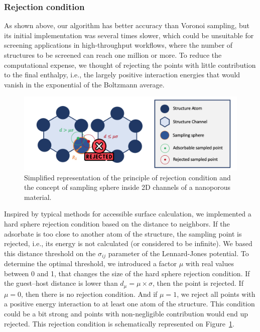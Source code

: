 \documentclass[main]{subfiles}
\begin{document}
\subsubsection{Rejection condition}\label{sct:rejection_condition}

As shown above, our algorithm has better accuracy than Voronoi sampling, but its initial implementation was several times slower, which could be unsuitable for screening applications in high-throughput workflows, where the number of structures to be screened can reach one million or more. To reduce the computational expense, we thought of rejecting the points with little contribution to the final enthalpy, i.e., the largely positive interaction energies that would vanish in the exponential of the  Boltzmann average.

\begin{figure}[ht]
\centering
  \includegraphics[width=\linewidth]{figures/3-fastsim/rejection_sampling_sphere.png}
  \caption{Simplified representation of the principle of rejection condition and the concept of sampling sphere inside 2D channels of a nanoporous material.}\label{fgr:feature}
\end{figure}

Inspired by typical methods for accessible surface calculation, we implemented a hard sphere rejection condition based on the distance to neighbors. If the adsorbate is too close to another atom of the structure, the sampling point is rejected, i.e., its energy is not calculated (or considered to be infinite). We based this distance threshold on the $\sigma_{ij}$ parameter of the Lennard-Jones potential. To determine the optimal threshold, we introduced a factor $\mu$ with real values between 0 and 1, that changes the size of the hard sphere rejection condition. If the guest--host distance is lower than $d_{\mu} = \mu \times \sigma$, then the point is rejected. If $\mu = 0$, then there is no rejection condition. And if $\mu = 1$, we reject all points with a positive energy interaction to at least one atom of the structure. This condition could be a bit strong and points with non-negligible contribution would end up rejected. This rejection condition is schematically represented on Figure~\ref{fgr:feature}.
\end{document}
